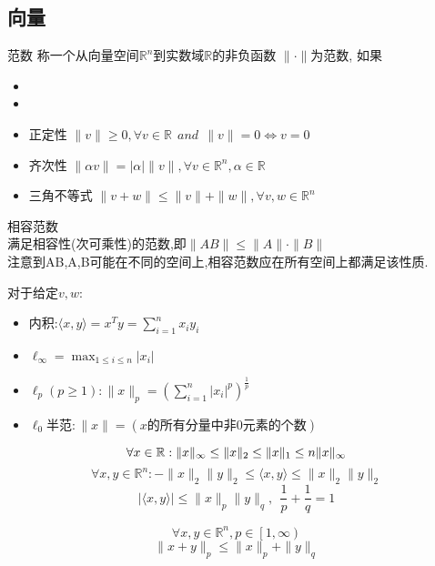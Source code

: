 \documentclass{mytemplate}
\begin{document}
\subsection{向量}
\begin{definition}{范数}
    称一个从向量空间$\mathbb{R}^n$到实数域$\mathbb{R}$的非负函数
    $\|\cdot\|$为范数, 如果
    \begin{itemize}
        \item
        \item
        \item 正定性 $\|v\| \geq 0, \forall v \in \mathbb{R}\ \  and \ \  \|v\| = 0 \Leftrightarrow v=0$
        \item 齐次性 $\|\alpha v\| = |\alpha|\|v\|, \forall v \in \mathbb{R}^n, \alpha \in \mathbb{R}$
        \item 三角不等式 $\|v+w\| \leq \|v\|+\|w\|, \forall v,w \in \mathbb{R}^n$
    \end{itemize}
\end{definition}
\begin{definition}{相容范数}
    \\ \vspace*{1em}\hspace*{2em} 满足相容性(次可乘性)的范数,即$\|AB\| \leq \|A\| \cdot \|B\| $
    \\\hspace*{2em} 注意到AB,A,B可能在不同的空间上,相容范数应在所有空间上都满足该性质.
\end{definition}
对于给定$v, w$:
\begin{itemize}
    \item 内积:$\langle x,y\rangle = x^Ty=\sum_{i=1}^{n}x_i y_i$
    \item $\ell_{\infty}=\max_{1\leq i \leq n} |x_i|$
    \item $\ell_{p}(p \geq 1): \|x\|_p = \left(\sum_{i=1}^{n}|x_i|^p\right)^{\frac{1}{p}}$
    \item $\ell_0\text{半范}:\|x\|=(x\text{的所有分量中非0元素的个数})$
\end{itemize}

\begin{proposition}
    $$
        \forall x \in \mathbb{R}:\\
        \|x\|_\infty \leq \|x\|_2\leq\|x\|_1\leq n\|x\|_\infty
    $$
    $$
        \forall x,y \in \mathbb{R}^n:
        -\|x\|_2\|y\|_2\leq \langle  x, y \rangle \leq \|x\|_2 \|y\|_2
    $$
    $$
        |\langle x, y \rangle| \leq \|x\|_p \|y\|_q, \ \
        \frac{1}{p} + \frac{1}{q} = 1
    $$

    $$
        \forall x, y\in \mathbb{R}^n, p\in \left[1, \infty \right)
    $$
    \[
        \|x+y\|_p \leq \|x\|_p + \|y\|_q
    \]
\end{proposition}
\end{document}
